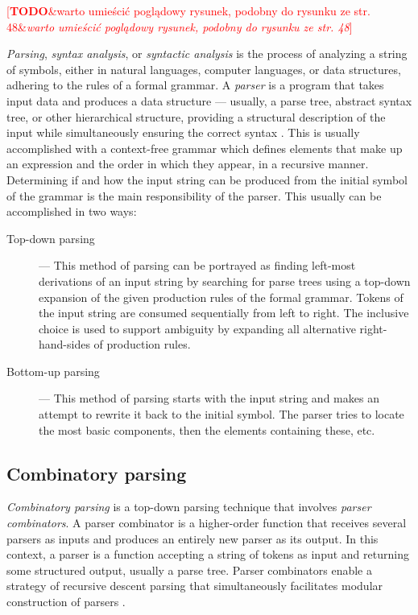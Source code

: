 \documentclass[english,bachelors,forcepolishlogotype]{wizthesis}
\newcommand{\todo}[1]{%
  \textcolor{red}{[\textbf{TODO}\ifx&#1&{}\else{ }\fi\emph{#1}]}%
}
\begin{document}
\todo{warto umieścić poglądowy rysunek, podobny do rysunku ze str. 48}

\emph{Parsing}, \emph{syntax analysis}, or \emph{syntactic analysis} is the
process of analyzing a string of symbols, either in natural languages, computer
languages, or data structures, adhering to the rules of a formal grammar. A
\emph{parser} is a program that takes input data and produces a data structure
--- usually, a parse tree, abstract syntax tree, or other hierarchical
structure, providing a structural description of the input while simultaneously
ensuring the correct syntax \cite{aho-2019,sipser-2009}. This is usually
accomplished with a context-free grammar which defines elements that make up an
expression and the order in which they appear, in a recursive manner.
Determining if and how the input string can be produced from the initial symbol
of the grammar is the main responsibility of the parser. This usually can be
accomplished in two ways:
\begin{description}
  \item[Top-down parsing] --- This method of parsing can be portrayed as finding
  left-most derivations of an input string by searching for parse trees using a
  top-down expansion of the given production rules of the formal grammar. Tokens
  of the input string are consumed sequentially from left to right. The
  inclusive choice is used to support ambiguity by expanding all alternative
  right-hand-sides of production rules.
  \item[Bottom-up parsing] --- This method of parsing starts with the input string
  and makes an attempt to rewrite it back to the initial symbol. The parser
  tries to locate the most basic components, then the elements containing these,
  etc.
\end{description}

\subsection{Combinatory parsing}

\emph{Combinatory parsing} is a top-down parsing technique that involves
\emph{parser combinators}. A parser combinator is a higher-order function that
receives several parsers as inputs and produces an entirely new parser as its
output. In this context, a parser is a function accepting a string of tokens as
input and returning some structured output, usually a parse tree. Parser
combinators enable a strategy of recursive descent parsing that simultaneously
facilitates modular construction of parsers \cite{swierstra-2009}.
\end{document}
